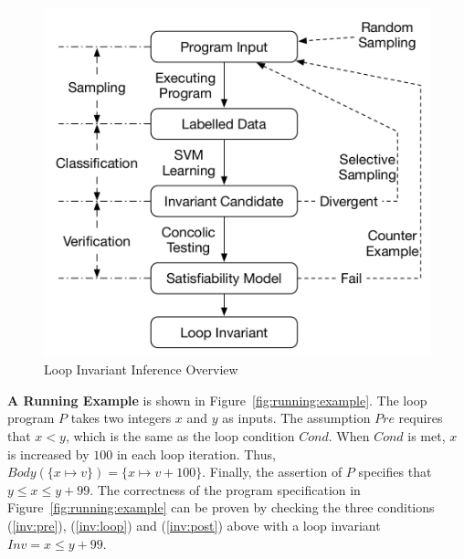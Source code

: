 \begin{figure}[t]
\begin{minipage}{.49\textwidth}
        \includegraphics[scale=0.42]{figures/overview.pdf}
        \caption{Loop Invariant Inference Overview}
        \label{fig:overview}
    \end{minipage}
\end{figure}

\medskip\noindent
\textbf{A Running Example}
is shown in Figure~\ref{fig:running:example}. 
The loop program $P$ takes two integers $x$ and $y$ as inputs. 
The assumption $\mathit{Pre}$ requires that $x < y$, 
which is the same as the loop condition $\mathit{Cond}$. 
When $\mathit{Cond}$ is met, 
$x$ is increased by $100$ in each loop iteration. 
Thus, $\mathit{Body}(\{ x \mapsto v \}) = \{ x \mapsto v + 100 \}$. 
Finally, the assertion of $P$ specifies that $y \le x \le y + 99$. 
The correctness of the program specification in Figure~\ref{fig:running:example} 
can be proven by checking the three conditions 
(\ref{inv:pre}), (\ref{inv:loop}) and (\ref{inv:post}) above 
with a loop invariant $\mathit{Inv} = x \le y + 99$. 

